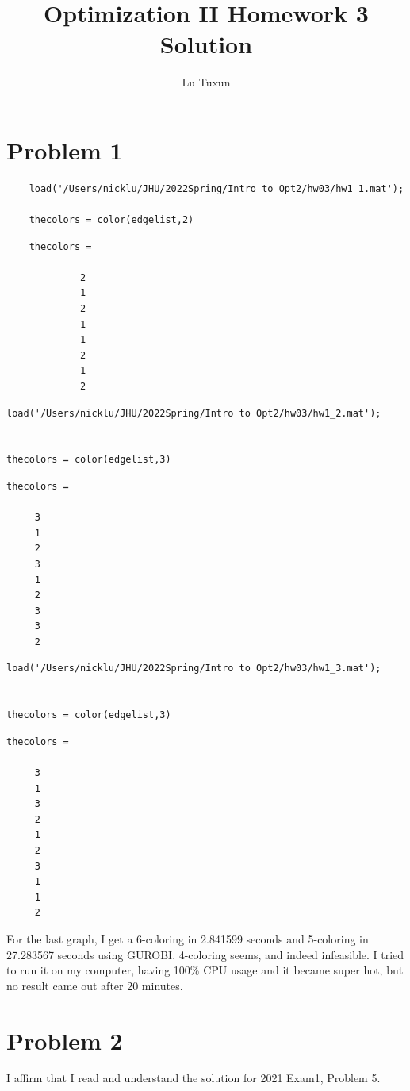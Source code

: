 \documentclass[a4paper]{article}
\title{Optimization II Homework 3 Solution}
\author{Lu Tuxun\\
	\ttfamily{tlu32@jhu.edu}}
\begin{document}
	\maketitle
	\section*{Problem 1}
	\begin{verbatim}
	load('/Users/nicklu/JHU/2022Spring/Intro to Opt2/hw03/hw1_1.mat');

	thecolors = color(edgelist,2)
	\end{verbatim}

  \color{lightgray} \begin{verbatim}
	thecolors =

		     2
		     1
		     2
		     1
		     1
		     2
		     1
		     2

\end{verbatim} \color{black}

 \begin{verbatim}
load('/Users/nicklu/JHU/2022Spring/Intro to Opt2/hw03/hw1_2.mat');


thecolors = color(edgelist,3)
\end{verbatim}

        \color{lightgray} \begin{verbatim}
thecolors =

     3
     1
     2
     3
     1
     2
     3
     3
     2
\end{verbatim} \color{black}
    \begin{verbatim}
load('/Users/nicklu/JHU/2022Spring/Intro to Opt2/hw03/hw1_3.mat');


thecolors = color(edgelist,3)
\end{verbatim}
\newpage
\hspace{3cm}
        \color{lightgray} \begin{verbatim}
thecolors =

     3
     1
     3
     2
     1
     2
     3
     1
     1
     2

\end{verbatim} \color{black}
    
For the last graph, I get a 6-coloring in 2.841599 seconds and 5-coloring in 27.283567 seconds using GUROBI. 4-coloring seems, and indeed infeasible. I tried to run it on my computer, having 100\% CPU usage and it became super hot, but no result came out after 20 minutes.

	\section*{Problem 2}
	I affirm that I read and understand the solution for 2021 Exam1, Problem 5.
\end{document}
